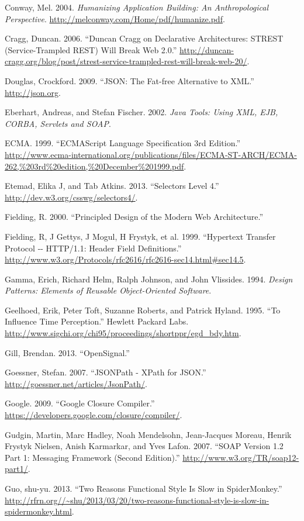 \documentclass[12pt, ]{article}
\begin{document}
Conway, Mel. 2004. \emph{Humanizing Application Building: An
Anthropological Perspective}.
\url{http://melconway.com/Home/pdf/humanize.pdf}.

Cragg, Duncan. 2006. ``Duncan Cragg on Declarative Architectures: STREST
(Service-Trampled REST) Will Break Web 2.0.''
\url{http://duncan-cragg.org/blog/post/strest-service-trampled-rest-will-break-web-20/}.

Douglas, Crockford. 2009. ``JSON: The Fat-free Alternative to XML.''
\url{http://json.org}.

Eberhart, Andreas, and Stefan Fischer. 2002. \emph{Java Tools: Using
XML, EJB, CORBA, Servlets and SOAP}.

ECMA. 1999. ``ECMAScript Language Specification 3rd Edition.''
\url{http://www.ecma-international.org/publications/files/ECMA-ST-ARCH/ECMA-262,\%203rd\%20edition,\%20December\%201999.pdf}.

Etemad, Elika J, and Tab Atkins. 2013. ``Selectors Level 4.''
\url{http://dev.w3.org/csswg/selectors4/}.

Fielding, R. 2000. ``Principled Design of the Modern Web Architecture.''

Fielding, R, J Gettys, J Mogul, H Frystyk, et al. 1999. ``Hypertext
Transfer Protocol -{}- HTTP/1.1: Header Field Definitions.''
\url{http://www.w3.org/Protocols/rfc2616/rfc2616-sec14.html\#sec14.5}.

Gamma, Erich, Richard Helm, Ralph Johnson, and John Vlissides. 1994.
\emph{Design Patterns: Elements of Reusable Object-Oriented Software}.

Geelhoed, Erik, Peter Toft, Suzanne Roberts, and Patrick Hyland. 1995.
``To Influence Time Perception.'' Hewlett Packard Labs.
\url{http://www.sigchi.org/chi95/proceedings/shortppr/egd_bdy.htm}.

Gill, Brendan. 2013. ``OpenSignal.''

Goessner, Stefan. 2007. ``JSONPath - XPath for JSON.''
\url{http://goessner.net/articles/JsonPath/}.

Google. 2009. ``Google Closure Compiler.''
\url{https://developers.google.com/closure/compiler/}.

Gudgin, Martin, Marc Hadley, Noah Mendelsohn, Jean-Jacques Moreau,
Henrik Frystyk Nielsen, Anish Karmarkar, and Yves Lafon. 2007. ``SOAP
Version 1.2 Part 1: Messaging Framework (Second Edition).''
\url{http://www.w3.org/TR/soap12-part1/}.

Guo, shu-yu. 2013. ``Two Reasons Functional Style Is Slow in
SpiderMonkey.''
\url{http://rfrn.org//~shu/2013/03/20/two-reasons-functional-style-is-slow-in-spidermonkey.html}.
\end{document}

